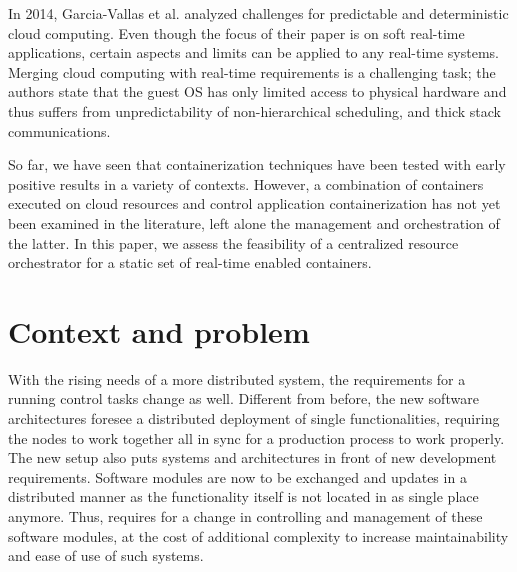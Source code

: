 \documentclass[]{scrartcl}
\begin{document}
In 2014, Garcia-Vallas et al. \cite{Garcia-Vallsetal2014} analyzed challenges for predictable and deterministic cloud computing.
Even though the focus of their paper is on soft real-time applications, certain aspects and limits can be applied to any real-time systems.
Merging cloud computing with real-time requirements is a challenging task; the authors state that the guest OS has only limited access to physical hardware and thus suffers from unpredictability of non-hierarchical scheduling, and thick stack communications. 


So far, we have seen that containerization techniques have been tested with early positive results in a variety of contexts.
However, a combination of containers executed on cloud resources and control application containerization has not yet been examined in the literature, left alone the management and orchestration of the latter. 
In this paper, we assess the feasibility of a centralized resource orchestrator for a static set of real-time enabled containers.


\section{Context and problem}
\label{sec:context}

With the rising needs of a more distributed system, the requirements for a running control tasks change as well.
Different from before, the new software architectures foresee a distributed deployment of single functionalities, requiring the nodes to work together all in sync for a production process to work properly. 
The new setup also puts systems and architectures in front of new development requirements. Software modules are now to be exchanged and updates in a distributed manner as the functionality itself is not located in as single place anymore. 
Thus, requires for a change in controlling and management of these software modules, at the cost of additional complexity to increase maintainability and ease of use of such systems.
\end{document}
